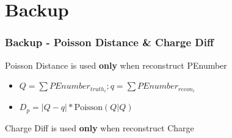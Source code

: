 \documentclass{beamer}
\begin{document}
\appendix
\section{Backup}
\begin{frame}[noframenumbering]
\thispagestyle{empty}
\frametitle{Backup - Poisson Distance \& Charge Diff}
\hspace{4mm}Poisson Distance is used \textbf{only} when reconstruct PEnumber
\begin{itemize}
    \item $Q = \sum PEnumber_{truth_i}; q = \sum PEnumber_{recon_i}$
    \item $D_{p} = |Q-q|*\mathrm{Poisson}(Q|Q)$
\end{itemize}
\hspace{4mm}Charge Diff is used \textbf{only} when reconstruct Charge
\end{frame}
\end{document}
